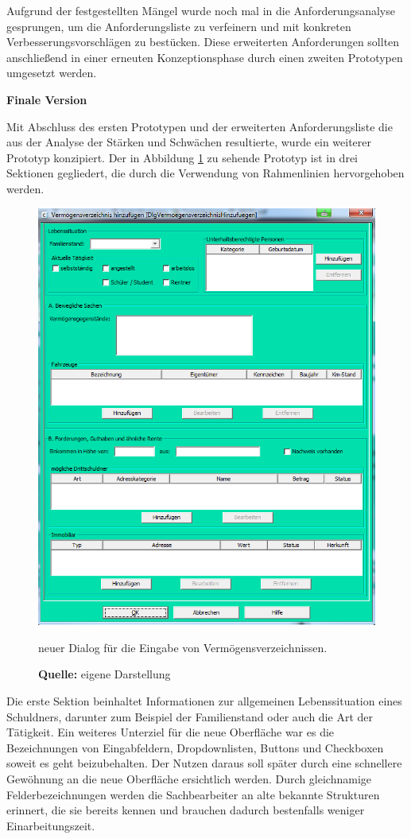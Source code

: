 Aufgrund der festgestellten Mängel wurde noch mal in die Anforderungsanalyse gesprungen, um die Anforderungsliste zu verfeinern und mit konkreten Verbesserungsvorschlägen zu bestücken. Diese erweiterten Anforderungen sollten anschließend in einer erneuten Konzeptionsphase durch einen zweiten Prototypen umgesetzt werden.

\textbf{Finale Version}

Mit Abschluss des ersten Prototypen und der erweiterten Anforderungsliste die aus der Analyse der Stärken und Schwächen resultierte, wurde ein weiterer Prototyp konzipiert. Der in Abbildung \ref{fig:neuerDialog} zu sehende Prototyp ist in drei Sektionen gegliedert, die durch die Verwendung von Rahmenlinien hervorgehoben werden. 
\begin{figure}[H]
  \centering
  \includegraphics[scale=0.85]{img/neuer_Dialog.PNG}
  \caption{neuer Dialog für die Eingabe von Vermögensverzeichnissen.}
    \caption*{\textbf{Quelle:} eigene Darstellung}
  \label{fig:neuerDialog}
\end{figure}
Die erste Sektion beinhaltet Informationen zur allgemeinen Lebenssituation eines Schuldners, darunter zum Beispiel der Familienstand oder auch die Art der Tätigkeit. Ein weiteres Unterziel für die neue Oberfläche war es die Bezeichnungen von Eingabfeldern, Dropdownlisten, Buttons und Checkboxen soweit es geht beizubehalten. Der Nutzen daraus soll später durch eine schnellere Gewöhnung an die neue Oberfläche ersichtlich werden. Durch gleichnamige Felderbezeichnungen werden die Sachbearbeiter an alte bekannte Strukturen erinnert, die sie bereits kennen und brauchen dadurch bestenfalls weniger Einarbeitungszeit.

